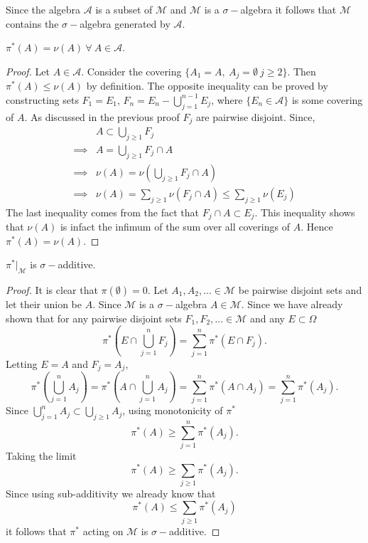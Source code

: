  \begin{remark}
   Since the algebra $ \mathscr{A}$ is a subset of $ \mathscr{M}$ and $ \mathscr{M}$ is a $\sigma-$algebra it follows that $ \mathscr{M}$ contains the $\sigma-$algebra generated by $ \mathscr{A}$. 
 \end{remark}
 \begin{proposition} 
   $\pi^*(A) = \nu(A)\ \forall\ A\in \mathscr{A}$.
 \end{proposition}
 \begin{proof}
   Let $A \in \mathscr{A}$. Consider the covering $\{A_1 = A,\ A_j = \emptyset\ j\geq 2\}$. Then $\pi^*(A) \leq \nu(A)$ by definition. The opposite inequality can be proved by constructing sets $F_1 = E_1$, $F_n = E_n - \bigcup_{j=1}^{n-1}E_j$, where $\{E_n\in \mathscr{A}\}$ is some covering of $A$. As discussed in the previous proof $F_j$ are pairwise disjoint. Since,
   \begin{align*}
     &A \subset \bigcup_{j\geq1}F_j \\
     \implies &A = \bigcup_{j\geq1}F_j\cap A\\
     \implies &\nu(A) = \nu(\bigcup_{j\geq1}F_j\cap A)\\
     \implies &\nu(A) = \sum_{j\geq1} \nu(F_j \cap A) \leq \sum_{j\geq1} \nu(E_j)
   \end{align*}
   The last inequality comes from the fact that $F_j \cap A \subset E_j$. This inequality shows that $\nu(A)$ is infact the infimum of the sum over all coverings of $A$. Hence $\pi^*(A) = \nu(A)$.  
 \end{proof}
 \begin{proposition}
   $\pi^*|_{ \mathscr{M} }$ is $\sigma-$additive.
 \end{proposition}
 \begin{proof}
   It is clear that $\pi(\emptyset) = 0$. Let $A_1,A_2,...\in \mathscr{M}$ be pairwise disjoint sets and let their union be $A$. Since $ \mathscr{M}$ is a $\sigma-$algebra $A\in \mathscr{M}$. Since we have already shown that for any pairwise disjoint sets $F_1, F_2,... \in \mathscr{M}$ and any $E\subset \Omega$
   \[\pi^*(E \cap \bigcup_{j=1}^n F_j) = \sum_{j=1}^n \pi^*(E\cap F_j).\]
   Letting $E=A$ and $F_j = A_j$,
   \[\pi^*(\bigcup_{j= 1}^nA_j) = \pi^*(A \cap \bigcup_{j=1}^n A_j) = \sum_{j=1}^n \pi^*(A\cap A_j) = \sum_{j=1}^n \pi^*(A_j).\]
   Since $\bigcup_{j=1}^n A_j \subset \bigcup_{j\geq 1} A_j$, using monotonicity of $\pi^*$
   \[\pi^*(A) \geq \sum_{j=1}^n\pi^*(A_j).\]
   Taking the limit
   \[\pi^*(A) \geq \sum_{j\geq1}\pi^*(A_j).\]
   Since using sub-additivity we already know that
   \[\pi^*(A) \leq \sum_{j\geq1}\pi^*(A_j)\]
   it follows that $\pi^*$ acting on $ \mathscr{M}$ is $\sigma-$additive. 
 \end{proof}

